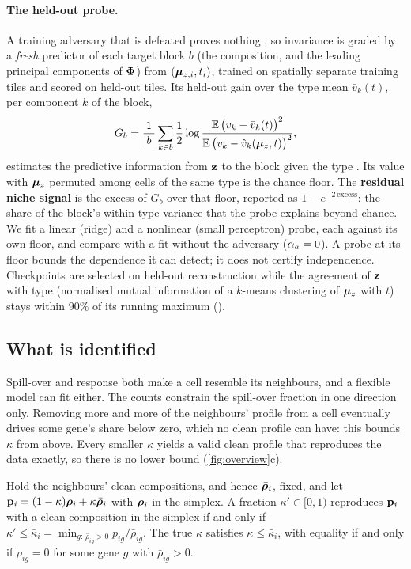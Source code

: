 \paragraph{The held-out probe.}
\label{sec:selection}
A training adversary that is defeated proves nothing \citep{elazar2018}, so invariance is graded by a \emph{fresh} predictor of each target block $b$ (the composition, and the leading principal components of $\boldsymbol{\Phi}$) from $(\boldsymbol{\mu}_{z,i}, t_i)$, trained on spatially separate training tiles and scored on held-out tiles. Its held-out gain over the type mean $\bar v_k(t)$, per component $k$ of the block,
\begin{equation}
  G_b = \frac{1}{|b|}\sum_{k \in b} \frac{1}{2}\log \frac{\operatorname{\mathbb{E}}\big(v_k - \bar v_k(t)\big)^2}{\operatorname{\mathbb{E}}\big(v_k - \hat v_k(\boldsymbol{\mu}_z, t)\big)^2},
  \label{eq:probe}
\end{equation}
estimates the predictive information from $\mathbf{z}$ to the block given the type \citep{xu2020vinfo}. Its value with $\boldsymbol{\mu}_z$ permuted among cells of the same type is the chance floor. The \textbf{residual niche signal} is the excess of $G_b$ over that floor, reported as $1 - e^{-2\,\text{excess}}$: the share of the block's within-type variance that the probe explains beyond chance. We fit a linear (ridge) and a nonlinear (small perceptron) probe, each against its own floor, and compare with a fit without the adversary ($\alpha_a = 0$). A probe at its floor bounds the dependence it can detect; it does not certify independence. Checkpoints are selected on held-out reconstruction while the agreement of $\mathbf{z}$ with type (normalised mutual information of a $k$-means clustering of $\boldsymbol{\mu}_z$ with $t$) stays within $90\%$ of its running maximum ().

\subsection{What is identified}
\label{sec:sweep}

Spill-over and response both make a cell resemble its neighbours, and a flexible model can fit either. The counts constrain the spill-over fraction in one direction only. Removing more and more of the neighbours' profile from a cell eventually drives some gene's share below zero, which no clean profile can have: this bounds $\kappa$ from above. Every smaller $\kappa$ yields a valid clean profile that reproduces the data exactly, so there is no lower bound (\cref{fig:overview}c).

\begin{proposition}\label{prop:kappa-bound}
Hold the neighbours' clean compositions, and hence $\bar{\boldsymbol{\rho}}_i$, fixed, and let $\mathbf{p}_i = (1-\kappa)\boldsymbol{\rho}_i + \kappa\bar{\boldsymbol{\rho}}_i$ with $\boldsymbol{\rho}_i$ in the simplex. A fraction $\kappa' \in [0, 1)$ reproduces $\mathbf{p}_i$ with a clean composition in the simplex if and only if $\kappa' \le \bar\kappa_i = \min_{g:\,\bar\rho_{ig} > 0} p_{ig}/\bar\rho_{ig}$. The true $\kappa$ satisfies $\kappa \le \bar\kappa_i$, with equality if and only if $\rho_{ig} = 0$ for some gene $g$ with $\bar\rho_{ig} > 0$.
\end{proposition}

